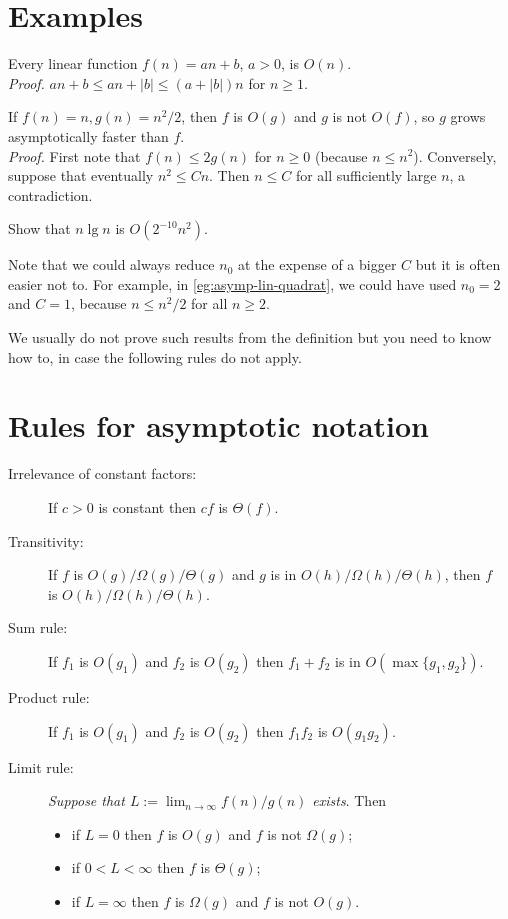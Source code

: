 \section{Examples}
\begin{Boxample}
Every linear function $f(n) = an + b$, $a > 0$, is $O(n)$.\\
\textit{Proof.} $an + b \leq an + |b| \leq (a + |b|) n$ for $n \geq 1$. 
\end{Boxample}

\begin{Boxample} 
\label{eg:asymp-lin-quadrat}
If $f(n) = n, g(n) = n^2/2$, then $f$ is $O(g)$ and $g$ is not
$O(f)$, so $g$ grows asymptotically faster than $f$.\\
\textit{Proof.} First note that $f(n) \leq 2 g(n)$ for $n \geq 0$ (because $n \leq n^2$). 
Conversely, suppose that eventually $n^2 \leq Cn$. 
Then $n \leq C$ for all sufficiently large $n$, a contradiction.
\end{Boxample}

\begin{Boxample}[4]
Show that $n \lg n$ is $O(2^{-10} n^2)$.
\end{Boxample}

Note that we could always reduce $n_0$ at the expense of a bigger $C$ but 
it is often easier not to. For example, in \cref{eg:asymp-lin-quadrat}, we could have used 
$n_0 = 2$ and $C = 1$, because $n\leq n^2/2$ for all $n\geq 2$.

We usually do not prove such results from the definition but you
need to know how to, in case the following rules do not apply.

\section{Rules for asymptotic notation}
\begin{description}
\item[Irrelevance of constant factors:] If $c > 0$ is constant then $cf$ is $\Theta(f)$.
\item[Transitivity:] If $f$ is $O(g)/\Omega(g)/\Theta(g)$ and $g$ is 
in $O(h)/\Omega(h)/\Theta(h)$, then $f$\\ is $O(h)/\Omega(h)/\Theta(h)$.
\item[Sum rule:] If $f_1$ is $O(g_1)$ and $f_2$ is $O(g_2)$ then $f_1 + f_2$ is 
in $O(\max\{g_1, g_2\})$.
\item[Product rule:] If $f_1$ is $O(g_1)$ and $f_2$ is $O(g_2)$ then $f_1 f_2$ 
is $O(g_1 g_2)$.
\item[Limit rule:] \emph{Suppose that $L:=\lim_{n\to\infty} f(n)/g(n)$ exists}. 
Then
\begin{itemize}
\item if $L = 0$ then $f$ is $O(g)$ and $f$ is not $\Omega(g)$;
\item if $0 < L < \infty$ then $f$ is $\Theta(g)$;
\item if $L = \infty$ then $f$ is $\Omega(g)$ and $f$ is not $O(g)$.
\end{itemize}
\end{description}

